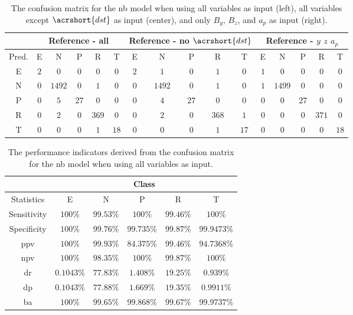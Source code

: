 \documentclass[sn-mathphys-num]{sn-jnl}%
\begin{document}
\begin{table}[!ht]
    \centering
    \caption{The confusion matrix for the \acrlong{nb} model when using all variables as input (left), all variables except $\acrshort{dst}$ as input (center), and only $B_{y}$, $B_{z}$, and $a_{p}$ as input (right).}
	\label{tab:cm:merged}
	\begin{tabular}{|c|c|c|c|c|c|c|c|c|c|c|c|c|c|c|c|}
		\hline
		 & \multicolumn{5}{|c|}{Reference - all} & \multicolumn{5}{|c|}{Reference - no $\acrshort{dst}$} & \multicolumn{5}{|c|}{Reference - $y$ $z$ $a_{p}$} \\ \hline
		 Pred. & E & N & P & R & T & E & N & P & R & T & E & N & P & R & T \\ \hline
		 E & $2$ & $0$ & $0$ & $0$ & $0$ & $2$ & $1$ & $0$ & $1$ & $0$ & $1$ & $0$ & $0$ & $0$ & $0$ \\ \hline
		 N & $0$ & $1492$ & $0$ & $1$ & $0$ & $0$ & $1492$ & $0$ & $1$ & $0$ & $1$ & $1499$ & $0$ & $0$ & $0$ \\ \hline
		 P & $0$ & $5$ & $27$ & $0$ & $0$ & $0$ & $4$ & $27$ & $0$ & $0$ & $0$ & $0$ & $27$ & $0$ & $0$ \\ \hline
		 R & $0$ & $2$ & $0$ & $369$ & $0$ & $0$ & $2$ & $0$ & $368$ & $1$ & $0$ & $0$ & $0$ & $371$ & $0$ \\ \hline
		 T & $0$ & $0$ & $0$ & $1$ & $18$ & $0$ & $0$ & $0$ & $1$ & $17$ & $0$ & $0$ & $0$ & $0$ & $18$ \\ \hline
	\end{tabular}
\end{table}

\begin{table}[!ht]
    \centering
    \caption{The performance indicators derived from the confusion matrix for the \acrlong{nb} model when using all variables as input.}
	\label{tab:cs:reverse:all:nb}
	\begin{tabular}{|c|c|c|c|c|c|}
		\hline
		 & \multicolumn{5}{c|}{Class} \\ \hline
		Statistics & E & N & P & R & T \\ \hline
		Sensitivity & $100\%$ & $99.53\%$ & $100\%$ & $99.46\%$ & $100\%$ \\ \hline
		Specificity & $100\%$ & $99.76\%$ & $99.735\%$ & $99.87\%$ & $99.9473\%$ \\ \hline
		\acrshort{ppv} & $100\%$ & $99.93\%$ & $84.375\%$ & $99.46\%$ & $94.7368\%$ \\ \hline
		\acrshort{npv} & $100\%$ & $98.35\%$ & $100\%$ & $99.87\%$ & $100\%$ \\ \hline
		\acrshort{dr} & $0.1043\%$ & $77.83\%$ & $1.408\%$ & $19.25\%$ & $0.939\%$ \\ \hline
		\acrshort{dp} & $0.1043\%$ & $77.88\%$ & $1.669\%$ & $19.35\%$ & $0.9911\%$ \\ \hline
		\acrshort{ba} & $100\%$ & $99.65\%$ & $99.868\%$ & $99.67\%$ & $99.9737\%$ \\ \hline
	\end{tabular}
\end{table}
\end{document}

